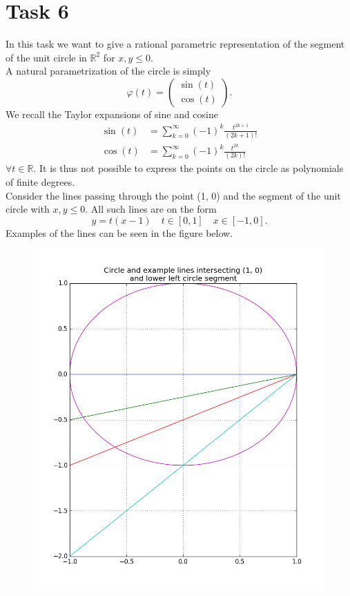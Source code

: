 \documentclass[]{article}
\begin{document}
\section*{Task 6}
In this task we want to give a rational parametric representation of the segment of the unit circle in $\mathbb{R}^2$ for $x, y \leq 0$.\\
A natural parametrization of the circle is simply\begin{equation*}
\varphi(t) = \left(\begin{array}{c}
\sin(t)\\
\cos(t)
\end{array}\right).
\end{equation*}
We recall the Taylor expansions of sine and cosine\begin{equation}
\begin{aligned}
\sin(t) &= \sum_{k=0}^{\infty}(-1)^k\frac{t^{2k+1}}{(2k+1)!}\\
\cos(t) &= \sum_{k=0}^{\infty}(-1)^k\frac{t^{2k}}{(2k)!}
\end{aligned}
\end{equation}
$\forall t\in\mathbb{R}$. It is thus not possible to express the points on the circle as polynomials of finite degrees.\\
Consider the lines passing through the point (1, 0) and the segment of the unit circle with $x, y\leq 0$. All such lines are on the form \begin{equation}\label{lines}
y=t(x-1)\quad t\in[0, 1]\quad x\in[-1, 0].
\end{equation}
Examples of the lines can be seen in the figure below.
\begin{figure}[h!]
	\includegraphics[scale=0.6]{circlelines}
\end{figure}
\end{document}
